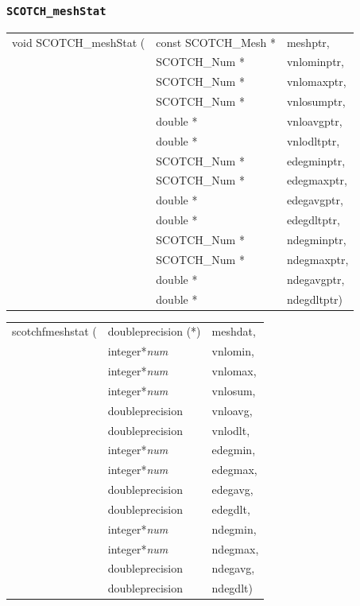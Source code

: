 \subsubsection{{\tt SCOTCH\_meshStat}}

\begin{itemize}
\progsyn

{\tt\begin{tabular}{l@{}ll}
void SCOTCH\_meshStat ( & const SCOTCH\_Mesh * & meshptr,    \\
                        & SCOTCH\_Num *        & vnlominptr, \\
                        & SCOTCH\_Num *        & vnlomaxptr, \\
                        & SCOTCH\_Num *        & vnlosumptr, \\
                        & double *             & vnloavgptr, \\
                        & double *             & vnlodltptr, \\
                        & SCOTCH\_Num *        & edegminptr, \\
                        & SCOTCH\_Num *        & edegmaxptr, \\
                        & double *             & edegavgptr, \\
                        & double *             & edegdltptr, \\
                        & SCOTCH\_Num *        & ndegminptr, \\
                        & SCOTCH\_Num *        & ndegmaxptr, \\
                        & double *             & ndegavgptr, \\
                        & double *             & ndegdltptr)
\end{tabular}}

{\tt\begin{tabular}{l@{}ll}
scotchfmeshstat ( & doubleprecision (*) & meshdat, \\
                  & integer*{\it num}   & vnlomin, \\
                  & integer*{\it num}   & vnlomax, \\
                  & integer*{\it num}   & vnlosum, \\
                  & doubleprecision     & vnloavg, \\
                  & doubleprecision     & vnlodlt, \\
                  & integer*{\it num}   & edegmin, \\
                  & integer*{\it num}   & edegmax, \\
                  & doubleprecision     & edegavg, \\
                  & doubleprecision     & edegdlt, \\
                  & integer*{\it num}   & ndegmin, \\
                  & integer*{\it num}   & ndegmax, \\
                  & doubleprecision     & ndegavg, \\
                  & doubleprecision     & ndegdlt)
\end{tabular}}


\end{itemize}
